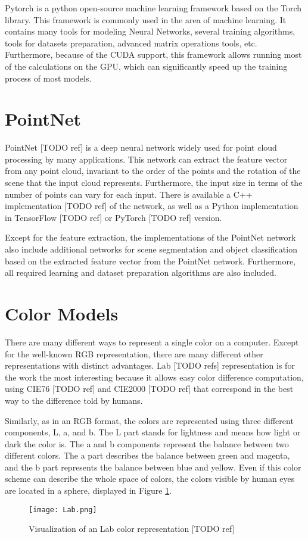 Pytorch is a python open-source machine learning framework based on the Torch library. This framework is commonly used in the area of machine learning. It contains many tools for modeling Neural Networks, several training algorithms, tools for datasets preparation, advanced matrix operations tools, etc. Furthermore, because of the CUDA support, this framework allows running most of the calculations on the GPU, which can significantly speed up the training process of most models.

\section{PointNet}\label{section:pointNet}

PointNet [TODO ref] is a deep neural network widely used for point cloud processing by many applications. This network can extract the feature vector from any point cloud, invariant to the order of the points and the rotation of the scene that the input cloud represents. Furthermore, the input size in terms of the number of points can vary for each input. There is available a C++ implementation [TODO ref] of the network, as well as a Python implementation in TensorFlow [TODO ref] or PyTorch [TODO ref] version.\par
Except for the feature extraction, the implementations of the PointNet network also include additional networks for scene segmentation and object classification based on the extracted feature vector from the PointNet network. Furthermore, all required learning and dataset preparation algorithms are also included.

\section{Color Models}\label{section:colorModels}

There are many different ways to represent a single color on a computer. Except for the well-known RGB representation, there are many different other representations with distinct advantages. Lab [TODO refs] representation is for the work the most interesting because it allows easy color difference computation, using CIE76 [TODO ref] and CIE2000 [TODO ref] that correspond in the best way to the difference told by humans.\par
Similarly, as in an RGB format, the colors are represented using three different components, L, a, and b. The L part stands for lightness and means how light or dark the color is. The a and b components represent the balance between two different colors. The a part describes the balance between green and magenta, and the b part represents the balance between blue and yellow. Even if this color scheme can describe the whole space of colors, the colors visible by human eyes are located in a sphere, displayed in Figure \ref{fig:labscheme}.

\begin{figure}[htpb]
    \centering
    \texttt{[image: Lab.png]}
    \caption{Visualization of an Lab color representation [TODO ref]} \label{fig:labscheme}
\end{figure}
